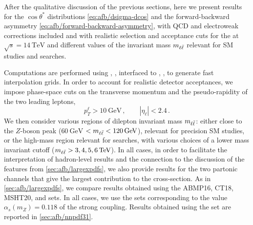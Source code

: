 
After the qualitative discussion of the previous sections, here we
present results for the $\cos\theta^*$
distributions \cref{eq:afb/dsigma-dcos} and the
forward-backward asymmetry \cref{eq:afb/forward-backward-asymmetry}, with
\nlo QCD and electroweak corrections included and
with realistic selection and acceptance cuts for the \lhc at $\sqrt{s} = \SI{14}{\tera\electronvolt}$
and different values of the invariant mass $m_{\ell\bar{\ell}}$ relevant for SM
studies and \bsm searches.

Computations are performed using \mgamc, \cite{Alwall:2014hca},
interfaced to \pineappl,
\cite{Carrazza:2020gss,christopher_schwan_2022_7023438}, to generate fast
interpolation grids.
%
In order to account for realistic detector acceptances,
we impose phase-space cuts on the transverse momentum and the pseudo-rapidity of the two
leading leptons,
\begin{equation}
  p_T^{\ell} > \SI{10}{\giga\electronvolt} \, ,\qquad |\eta_{\ell}| < 2.4 \,.
\end{equation}
We then consider various regions of dilepton invariant mass $m_{\ell\bar{\ell}}$:
either close to the $Z$-boson peak ($\SI{60}{\giga\electronvolt}$ $< m_{\ell\bar{\ell}} < \SI{120}{\giga\electronvolt}$),
relevant for precision SM studies, or the
high-mass region relevant for \bsm searches, with  various choices of a
lower mass invariant cutoff ($\mll > 3,4,5,\SI{6}{\tera\electronvolt}$).
%
In all cases, in order to facilitate the interpretation of
hadron-level results  and the connection to
the discussion of the \pdf features from \cref{sec:afb/largexpdfs},
we also provide results for the two partonic channels that give the
largest contribution to the cross-section.
%
As in \cref{sec:afb/largexpdfs}, we compare results obtained using
the  ABMP16, CT18, MSHT20, and  \pdf sets.
%
In all cases, we
use the  \nnlo sets corresponding to the value $\alpha_s(m_Z)=0.118$
of the strong coupling.
%
Results obtained using the  \pdf set are reported in
\cref{sec:afb/nnpdf31}.


